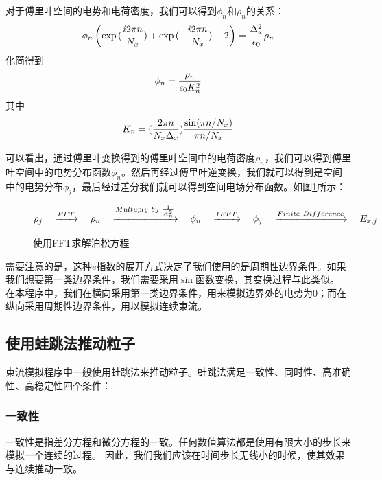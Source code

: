 {对于傅里叶空间的电势和电荷密度，我们可以得到$\phi_{n}$和$\rho_{n}$的关系：
\begin{equation}\label{eq:FFT@PIC3}
\phi_{n}\left(\exp{(\frac{i2 \pi n}{N_x} )}  +  \exp{(-\frac{i2 \pi n}{N_x})} - 2 \right)
 = \frac{\Delta _{x}^{2}}{\epsilon _0} {\rho_n} \\
\end{equation}
化简得到
\begin{equation}\label{eq:FFT@PIC3_consice}
\phi_{n} = \frac{\rho_n}{\epsilon _0 K_n^2} \\
\end{equation}
其中
\begin{equation}\label{eq:FFT@PIC4}
K_n = (\frac{2\pi n}{N_x \Delta _x}) \frac{\sin({\pi n}/{N_x})}{{\pi n}/{N_x}} \\
\end{equation}

可以看出，通过傅里叶变换得到的傅里叶空间中的电荷密度$\rho_{n}$，我们可以得到傅里叶空间中的电势分布函数$\phi_{n}$。然后再经过傅里叶逆变换，我们就可以得到是空间中的电势分布$\phi_{j}$，最后经过差分我们就可以得到空间电场分布函数。如图\ref{fig:PIC_FFT_Poisson}所示：
\begin{figure}[ht]
  \begin{equation*}
    \centering
    \rho_j \quad \xrightarrow{FFT} \quad \rho_n  \quad \xrightarrow{Multuply\ by\ \frac{1}{K_n^2}}   \quad  \phi_n  \quad \xrightarrow{IFFT} \quad  \phi_j \quad \xrightarrow{Finite\ Difference} \quad  E_{x,j}
  \end{equation*}
  \caption{使用FFT求解泊松方程}
  \label{fig:PIC_FFT_Poisson}
\end{figure}

需要注意的是，这种$e$指数的展开方式决定了我们使用的是周期性边界条件。如果我们想要第一类边界条件，我们需要采用$\sin$函数变换，其变换过程与此类似。
在本程序中，我们在横向采用第一类边界条件，用来模拟边界处的电势为0；而在纵向采用周期性边界条件，用以模拟连续束流。

\subsection{使用蛙跳法推动粒子}
束流模拟程序中一般使用蛙跳法来推动粒子。蛙跳法满足一致性、同时性、高准确性、高稳定性四个条件：

\subsubsection{一致性}
      一致性是指差分方程和微分方程的一致。任何数值算法都是使用有限大小的步长来模拟一个连续的过程。
      因此，我们我们应该在时间步长无线小的时候，使其效果与连续推动一致。

}
